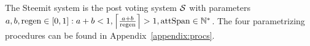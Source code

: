 \begin{definition}
  The Steemit system is the post voting system $\pvs$ with parameters $a, b,
  \regen \in \left[0, 1\right]: a + b < 1, \ceil*{\frac{a + b}{\regen}} > 1,
  \attspan \in \mathbb{N}^*$. The four parametrizing procedures can be found in
  Appendix~\ref{appendix:procs}.
\end{definition}
